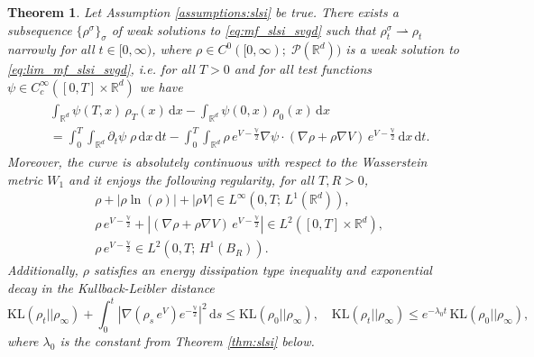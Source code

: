 \documentclass[reqno, 11pt]{amsart}
\numberwithin{equation}{section}
\newtheorem{thm}{Theorem}[section]
\theoremstyle{definition}
\begin{document}
\begin{thm}
    \label{thm:ex_weak_sol_loc_pde}
    Let Assumption \ref{assumptions:slsi} be true. There exists a subsequence $\{\rho^\sigma\}_\sigma$ of weak solutions to \eqref{eq:mf_slsi_svgd} such that $\rho^\sigma_t\rightharpoonup \rho_t$ narrowly for all $t \in [0,\infty)$, where $\rho\in C^0([0,\infty);\;\mathscr{P}(\mathbb{R}^{d}))$ is a weak solution to \eqref{eq:lim_mf_slsi_svgd}, i.e. for all $T>0$ and for all test functions $\psi\in C_c^\infty([0,T]\times \mathbb{R}^{d})$ we have
    \begin{align}
        \label{eq:weak_sol_loc_pde_slsi}
        \begin{split}
            &\int_{\mathbb{R}^{d}}\psi(T,x)\, \rho_T(x) \,\mathrm{d} x- \int_{\mathbb{R}^{d}}\psi(0,x)\, \rho_0(x) \,\mathrm{d} x\\
            &=
            \int_0^T \int_{\mathbb{R}^{d}}\partial_t\psi\; \rho \,\mathrm{d} x\,\mathrm{d} t-\int_0^T\int_{\mathbb{R}^{d}} \rho\, e^{V-\frac{\mathbb{V}}{2}}\nabla \psi\cdot (\nabla\rho +\rho \nabla V)\, e^{V-\frac{\mathbb{V}}{2}}\,\mathrm{d} x\,\mathrm{d} t.
        \end{split}
    \end{align}
    Moreover, the curve is absolutely continuous with respect to the Wasserstein metric $W_1$ and it enjoys the following regularity, for all $T,R>0$,
    \begin{align}
        \label{eq:regularity_weak_sol_slsi}
        &\rho+|\rho\ln(\rho)|+|\rho V|\in L^\infty(0,T;\, L^1(\mathbb{R}^{d})),\\
        \label{eq:regularity_weak_sol_slsi_2}
        &\rho \,e^{V-\frac{\mathbb{V}}{2}}+|(\nabla \rho+\rho \nabla V) \,e^{V-\frac{\mathbb{V}}{2}}|\in L^2([0,T]\times \mathbb{R}^{d}),\\
        \label{eq:regularity_weak_sol_slsi_3}
        &\rho\, e^{V-\frac{\mathbb{V}}{2}}\in L^2(0,T;\, H^1(B_R)).
    \end{align}
    Additionally, $\rho$ satisfies an energy dissipation type inequality and exponential decay in the Kullback-Leibler distance
    \begin{equation}\label{eq:edi_slsi}
        \mathrm{KL}(\rho_t||\rho_\infty) + \int_0^t |\nabla(\rho_s \, e^{V})e^{-\frac{\mathbb{V}}{2}}|^2\,\mathrm{d} s \leq \mathrm{KL}(\rho_0||\rho_\infty), \quad \mathrm{KL}(\rho_t||\rho_\infty)
        \leq e^{-\lambda_0 t}\, \mathrm{KL}(\rho_0||\rho_\infty),
    \end{equation}
    where $\lambda_0$ is the constant from Theorem \ref{thm:slsi} below.
\end{thm}
\end{document}
